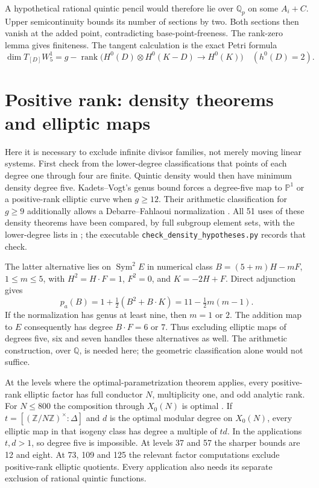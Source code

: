 \documentclass[11pt]{article}
\newcommand{\Q}{\mathbb Q}
\newcommand{\PP}{\mathbb P}
\theoremstyle{remark}\newtheorem{remark}[theorem]{Remark}
\begin{document}
A hypothetical rational quintic pencil would therefore lie over $\Q_p$
on some $A_i+C$. Upper semicontinuity bounds its number of sections by
two. Both sections then vanish at the added point, contradicting
base-point-freeness. The rank-zero lemma gives finiteness.
The tangent calculation is the exact Petri formula
\[
 \dim T_{[D]}W^1_5=g-\operatorname{rank}
 \bigl(H^0(D)\otimes H^0(K-D)\longrightarrow H^0(K)\bigr)
 \quad(h^0(D)=2).
\]

\section{Positive rank: density theorems and elliptic maps}
Here it is necessary to exclude infinite divisor families, not merely
moving linear systems. First check from the lower-degree classifications
that points of each degree one through four are finite. Quintic density
would then have minimum density degree five. Kadets--Vogt's genus bound
\cite[Theorem 1.3]{KV}
forces a degree-five map to $\PP^1$ or a positive-rank elliptic curve
when $g\ge12$. Their arithmetic classification for $g\ge9$ additionally
allows a Debarre--Fahlaoui normalization
\cite[Proposition 6.3, arithmetic row]{KV}.
All 51 uses of these density theorems have been compared, by full subgroup
element sets, with the lower-degree lists in \cite[Theorems 1.4--1.6]{DO};
the executable \texttt{check\_density\_hypotheses.py} records that check.

The latter alternative lies on $\operatorname{Sym}^2E$ in numerical class
$B=(5+m)H-mF$, $1\le m\le5$, with $H^2=H\cdot F=1$, $F^2=0$,
and $K=-2H+F$. Direct adjunction gives
\[
 p_a(B)=1+\tfrac12(B^2+B\cdot K)=11-\tfrac12m(m-1).
\]
If the normalization has genus at least nine, then $m=1$ or $2$.
The addition map to $E$ consequently has degree $B\cdot F=6$ or $7$.
Thus excluding elliptic maps of degrees five, six and seven handles
these alternatives as well. The arithmetic construction, over $\Q$,
is needed here; the geometric classification alone would not suffice.

At the levels where the optimal-parametrization theorem applies, every
positive-rank elliptic factor has full conductor $N$, multiplicity one,
and odd analytic rank. For $N\le800$ the composition through $X_0(N)$
is optimal \cite[Corollary 4.10]{DO}. If
$t=[(\mathbb Z/N\mathbb Z)^\times:\Delta]$ and $d$
is the optimal modular degree on $X_0(N)$, every elliptic map in that
isogeny class has degree a multiple of $td$. In the applications $t,d>1$,
so degree five is impossible. At levels 37 and 57 the sharper bounds
are 12 and eight. At 73, 109 and 125 the relevant factor computations
exclude positive-rank elliptic quotients. Every application also needs
its separate exclusion of rational quintic functions.
\end{document}
